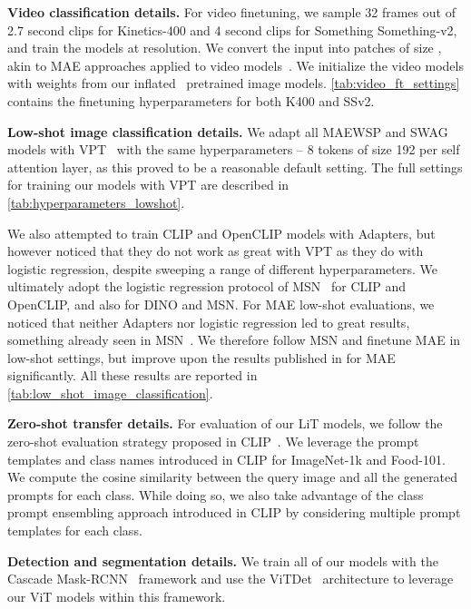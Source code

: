 \documentclass[10pt,twocolumn,letterpaper]{article}
\newcommand{\lit}{LiT\xspace}
\newcommand{\mae}{MAE\xspace}
\newcommand{\swag}{SWAG\xspace}
\newcommand{\ours}{MAEWSP\xspace}  \newcommand{\oursig}{\ours{}\textsubscript{IG}\xspace}
\newcommand{\clip}{CLIP\xspace}
\newcommand{\openclip}{OpenCLIP\xspace}
\newcommand{\dino}{DINO\xspace}
\newcommand{\msn}{MSN\xspace}
\newcommand{\vitDet}{ViTDet\xspace}
\newcommand{\vit}{ViT\xspace}
\newcommand{\inetOneK}{ImageNet-1k\xspace}
\newcommand{\kinetics}{Kinetics-400\xspace}
\newcommand{\kineticsShort}{K400\xspace}
\newcommand{\sthsth}{Something Something-v2\xspace}
\newcommand{\sthsthShort}{SSv2\xspace}
\newcommand{\food}{Food-101\xspace}
\begin{document}
{\bf \noindent Video classification details.}
For video finetuning, we sample 32 frames out of 2.7 second clips for \kinetics and 4 second clips for \sthsth, and train the
models at  resolution. We convert the
input into patches of size , akin to MAE approaches applied to video
models~\cite{feichtenhofer2022masked,tong2022videomae,girdhar2023omnimae}. We initialize the video models with
weights from our inflated~\cite{carreira2017quo} pretrained image models. \cref{tab:video_ft_settings}
contains the finetuning hyperparameters for both \kineticsShort and \sthsthShort.



{\bf \noindent Low-shot image classification details.}
We adapt all \ours and \swag models with VPT~\cite{jia2022visual} with the same hyperparameters -- 
8 tokens of size 192 per self attention layer, as this proved to be a reasonable default setting.
The full settings for training our models with VPT are described in \cref{tab:hyperparameters_lowshot}.

We also attempted to train \clip and \openclip models with Adapters, but however noticed that they 
do not work as great with VPT as they do with logistic regression, despite sweeping a range of different hyperparameters.
We ultimately adopt the logistic regression protocol of \msn~\cite{assran2022masked} for \clip and \openclip, and
also for \dino and \msn.
For \mae low-shot evaluations, we noticed that neither Adapters nor logistic regression led to great results,
something already seen in \msn~\cite{assran2022masked}. 
We therefore follow \msn and finetune \mae in low-shot settings, but improve upon the results published in 
\cite{assran2022masked} for \mae significantly.
All these results are reported in \cref{tab:low_shot_image_classification}.

{\bf \noindent Zero-shot transfer details.} For evaluation of our \lit models,
we follow the zero-shot evaluation strategy proposed in \clip~\cite{radford2021learning}. We leverage the prompt templates 
and class names introduced in \clip for \inetOneK and
\food. We compute the cosine similarity between the query image and all the generated prompts for each class.
While doing so, we also take advantage of the class prompt ensembling approach introduced
in \clip by considering multiple prompt templates for each class.

{\bf \noindent Detection and segmentation details.}
We train all of our models with the Cascade Mask-RCNN~\cite{he2017maskrcnn} framework and
use the \vitDet~\cite{li2022vitdet} architecture to leverage our \vit models within this framework.
\end{document}

